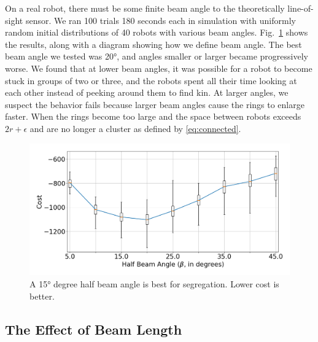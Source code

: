 \documentclass[letterpaper, 10 pt, conference]{ieeeconf}
\begin{document}
  On a real robot, there must be some finite beam angle to the theoretically
  line-of-sight sensor. We ran 100 trials 180 seconds each in simulation with uniformly random
  initial distributions of 40 robots with various beam
  angles. Fig.~\ref{fig:beam_angle} shows the results, along with a diagram
  showing how we define beam angle. The best beam angle we tested was \ang{20},
  and angles smaller or larger became progressively worse. We found that at lower
  beam angles, it was possible for a robot to become stuck in groups of two or
  three, and the robots spent all their time looking at each other instead of
  peeking around them to find kin. At larger angles, we suspect the behavior fails
  because larger beam angles cause the rings to enlarge faster. When the rings become
  too large and the space between robots exceeds $2r+\epsilon$
  and are no longer a cluster as defined by \eqref{eq:connected}.

  \begin{figure}[t]
    \centering
    \includegraphics[width=1\linewidth]{./images/beam_angle.png}
    \caption{A \ang{15} degree half beam angle is best for segregation. Lower cost is better.}
    \label{fig:beam_angle}
  \end{figure}

  \subsection{The Effect of Beam Length} \label{section:beam_range}
\end{document}

